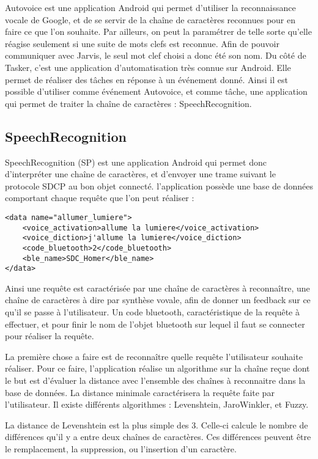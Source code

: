 Autovoice est une application Android qui permet d'utiliser la reconnaissance vocale de Google, et de se servir de la chaîne de caractères reconnues pour en faire ce que l'on souhaite. Par ailleurs, on peut la paramétrer de telle sorte qu'elle réagise seulement si une suite de mots clefs est reconnue. Afin de pouvoir communiquer avec Jarvis, le seul mot clef choisi a donc été son nom. Du côté de Tasker, c'est une application d'automatisation très connue sur Android. Elle permet de réaliser des tâches en réponse à un événement donné. Ainsi il est possible d'utiliser comme événement Autovoice, et comme tâche, une application qui permet de traiter la chaîne de caractères : SpeechRecognition.

	\subsection{SpeechRecognition}
	
SpeechRecognition (SP) est une application Android qui permet donc d'interpréter une chaîne de caractères, et d'envoyer une trame suivant le protocole SDCP au bon objet connecté. l'application possède une base de données comportant chaque requête que l'on peut réaliser :

\begin{lstlisting}[frame=single]
<data name="allumer_lumiere">
    <voice_activation>allume la lumiere</voice_activation>
    <voice_diction>j'allume la lumiere</voice_diction>
    <code_bluetooth>2</code_bluetooth>
    <ble_name>SDC_Homer</ble_name>
</data>
\end{lstlisting}

Ainsi une requête est caractérisée par une chaîne de caractères à reconnaître, une chaîne de caractères à dire par synthèse vovale, afin de donner un feedback sur ce qu'il se passe à l'utilisateur. Un code bluetooth, caractéristique de la requête à effectuer, et pour finir le nom de l'objet bluetooth sur lequel il faut se connecter pour réaliser la requête.

La première chose a faire est de reconnaître quelle requête l'utilisateur souhaite réaliser. Pour ce faire, l'application réalise un algorithme sur la chaîne reçue dont le but est d'évaluer la distance avec l'ensemble des chaînes à reconnaitre dans la base de données. La distance minimale caractérisera la requête faite par l'utilisateur. Il existe différents algorithmes : Levenshtein, JaroWinkler, et Fuzzy. 

La distance de Levenshtein est la plus simple des 3. Celle-ci calcule le nombre de différences qu'il y a entre deux chaînes de caractères. Ces différences peuvent être le remplacement, la suppression, ou l'insertion d'un caractère.

